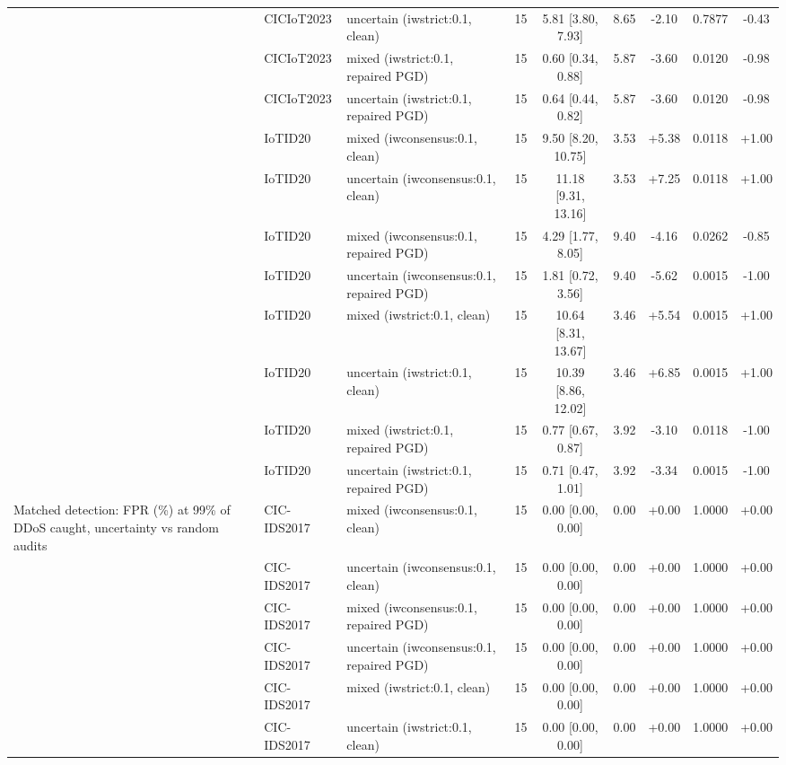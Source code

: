 \begin{table}[t]
\begin{tabular}{lllcccccc}
 & CICIoT2023 & uncertain (iwstrict:0.1, clean) & 15 & 5.81 [3.80, 7.93] & 8.65 & -2.10 & 0.7877 & -0.43 \\
 & CICIoT2023 & mixed (iwstrict:0.1, repaired PGD) & 15 & 0.60 [0.34, 0.88] & 5.87 & -3.60 & 0.0120 & -0.98 \\
 & CICIoT2023 & uncertain (iwstrict:0.1, repaired PGD) & 15 & 0.64 [0.44, 0.82] & 5.87 & -3.60 & 0.0120 & -0.98 \\
 & IoTID20 & mixed (iwconsensus:0.1, clean) & 15 & 9.50 [8.20, 10.75] & 3.53 & +5.38 & 0.0118 & +1.00 \\
 & IoTID20 & uncertain (iwconsensus:0.1, clean) & 15 & 11.18 [9.31, 13.16] & 3.53 & +7.25 & 0.0118 & +1.00 \\
 & IoTID20 & mixed (iwconsensus:0.1, repaired PGD) & 15 & 4.29 [1.77, 8.05] & 9.40 & -4.16 & 0.0262 & -0.85 \\
 & IoTID20 & uncertain (iwconsensus:0.1, repaired PGD) & 15 & 1.81 [0.72, 3.56] & 9.40 & -5.62 & 0.0015 & -1.00 \\
 & IoTID20 & mixed (iwstrict:0.1, clean) & 15 & 10.64 [8.31, 13.67] & 3.46 & +5.54 & 0.0015 & +1.00 \\
 & IoTID20 & uncertain (iwstrict:0.1, clean) & 15 & 10.39 [8.86, 12.02] & 3.46 & +6.85 & 0.0015 & +1.00 \\
 & IoTID20 & mixed (iwstrict:0.1, repaired PGD) & 15 & 0.77 [0.67, 0.87] & 3.92 & -3.10 & 0.0118 & -1.00 \\
 & IoTID20 & uncertain (iwstrict:0.1, repaired PGD) & 15 & 0.71 [0.47, 1.01] & 3.92 & -3.34 & 0.0015 & -1.00 \\
Matched detection: FPR (\%) at 99\% of DDoS caught, uncertainty vs random audits & CIC-IDS2017 & mixed (iwconsensus:0.1, clean) & 15 & 0.00 [0.00, 0.00] & 0.00 & +0.00 & 1.0000 & +0.00 \\
 & CIC-IDS2017 & uncertain (iwconsensus:0.1, clean) & 15 & 0.00 [0.00, 0.00] & 0.00 & +0.00 & 1.0000 & +0.00 \\
 & CIC-IDS2017 & mixed (iwconsensus:0.1, repaired PGD) & 15 & 0.00 [0.00, 0.00] & 0.00 & +0.00 & 1.0000 & +0.00 \\
 & CIC-IDS2017 & uncertain (iwconsensus:0.1, repaired PGD) & 15 & 0.00 [0.00, 0.00] & 0.00 & +0.00 & 1.0000 & +0.00 \\
 & CIC-IDS2017 & mixed (iwstrict:0.1, clean) & 15 & 0.00 [0.00, 0.00] & 0.00 & +0.00 & 1.0000 & +0.00 \\
 & CIC-IDS2017 & uncertain (iwstrict:0.1, clean) & 15 & 0.00 [0.00, 0.00] & 0.00 & +0.00 & 1.0000 & +0.00 \\

\end{tabular}
\end{table}
